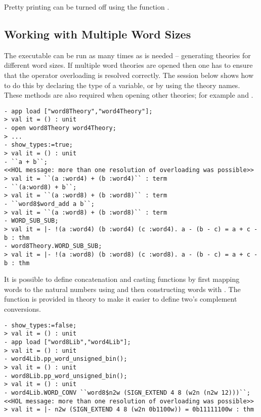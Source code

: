\noindent Pretty printing can be turned off using the function .

\subsection{Working with Multiple Word Sizes} \label{multiple}

The executable  can be run as many times as is needed -- generating theories for different word sizes.  If multiple word theories are opened then one has to ensure that the operator overloading is resolved correctly.  The session below shows how to do this by declaring the type of a variable, or by using the theory names.  These methods are also required when opening other theories; for example  and .
\setcounter{sessioncount}{0}
\begin{session}\begin{verbatim}
- app load ["word8Theory","word4Theory"];
> val it = () : unit
- open word8Theory word4Theory;
> ...
- show_types:=true;
> val it = () : unit
- ``a + b``;
<<HOL message: more than one resolution of overloading was possible>>
> val it = ``(a :word4) + (b :word4)`` : term
- ``(a:word8) + b``;
> val it = ``(a :word8) + (b :word8)`` : term
- ``word8$word_add a b``;
> val it = ``(a :word8) + (b :word8)`` : term
- WORD_SUB_SUB;
> val it = |- !(a :word4) (b :word4) (c :word4). a - (b - c) = a + c - b : thm
- word8Theory.WORD_SUB_SUB;
> val it = |- !(a :word8) (b :word8) (c :word8). a - (b - c) = a + c - b : thm
\end{verbatim}\end{session}

It is possible to define concatenation and casting functions by first mapping words to the natural numbers using  and then constructing words with .  The function  is provided in  theory to make it easier to define two's complement conversions.
\begin{session}\begin{verbatim}
- show_types:=false;
> val it = () : unit
- app load ["word8Lib","word4Lib"];
> val it = () : unit
- word4Lib.pp_word_unsigned_bin();
> val it = () : unit
- word8Lib.pp_word_unsigned_bin();
> val it = () : unit
- word4Lib.WORD_CONV ``word8$n2w (SIGN_EXTEND 4 8 (w2n (n2w 12)))``;
<<HOL message: more than one resolution of overloading was possible>>
> val it = |- n2w (SIGN_EXTEND 4 8 (w2n 0b1100w)) = 0b11111100w : thm
\end{verbatim}\end{session}
